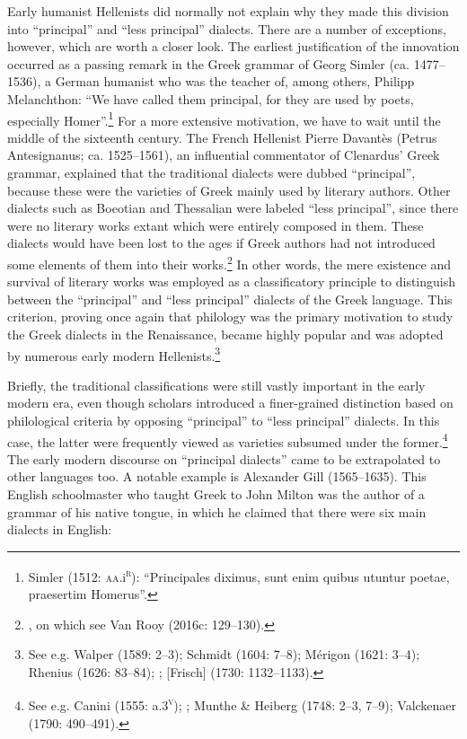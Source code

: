 Early humanist Hellenists did normally not explain why they made this division into “principal” and “less principal” dialects. There are a number of exceptions, however, which are worth a closer look. The earliest justification of the innovation occurred as a passing remark in the Greek grammar of Georg Simler (ca. 1477–1536), a German humanist who was the teacher of, among others, Philipp Melanchthon: “We have called them principal, for they are used by poets, especially Homer”.\footnote{Simler (1512: \textsc{aa.}i\textsc{\textsuperscript{r}}): “Principales diximus, sunt enim quibus utuntur poetae, praesertim Homerus”.} For a more extensive motivation, we have to wait until the middle of the sixteenth century. The French Hellenist Pierre Davantès (Petrus Antesignanus; ca. 1525–1561), an influential commentator of Clenardus’ Greek grammar, explained that the traditional dialects were dubbed “principal”, because these were the varieties of Greek mainly used by literary authors. Other dialects such as Boeotian and Thessalian were labeled “less principal”, since there were no literary works extant which were entirely composed in them. These dialects would have been lost to the ages if Greek authors had not introduced some elements of them into their works.\footnote{\citet[11]{Antesignanus1554}, on which see Van Rooy (2016c: 129–130).} In other words, the mere existence and survival of literary works was employed as a classificatory principle to distinguish between the “principal” and “less principal” dialects of the Greek language. This criterion, proving once again that philology was the primary motivation to study the Greek dialects in the Renaissance, became highly popular and was adopted by numerous early modern Hellenists.\footnote{See e.g. Walper (1589: 2–3); Schmidt (1604: 7–8); Mérigon (1621: 3–4); Rhenius (1626: 83–84); \citet[66]{Busby1696}; [Frisch] (1730: 1132–1133).}

Briefly, the traditional classifications were still vastly important in the early modern era, even though scholars introduced a finer-grained distinction based on philological criteria by opposing “principal” to “less principal” dialects. In this case, the latter were frequently viewed as varieties subsumed under the former.\footnote{See e.g. Canini (1555: a.3\textsc{\textsuperscript{v}}); \citet[439]{Saumaise1643a}; Munthe \& Heiberg (1748: 2–3, 7–9); Valckenaer (1790: 490–491).} The early modern discourse on “principal dialects” came to be extrapolated to other languages too. A notable example is Alexander Gill (1565–1635). This English schoolmaster who taught Greek to John Milton was the author of a grammar of his native tongue, in which he claimed that there were six main dialects in English:

